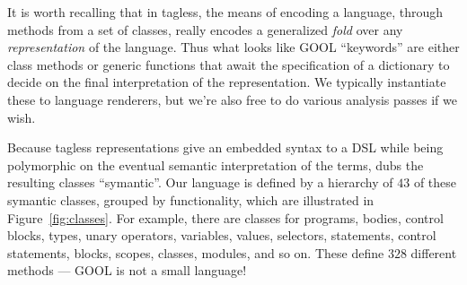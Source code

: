 \documentclass[sigplan,review,anonymous,prologue,dvipsnames]{acmart}
\begin{document}
It is worth recalling that in tagless, the means of encoding a language,
through methods from a set of classes, really encodes a generalized
\emph{fold} over any \emph{representation} of the language.  Thus what
looks like GOOL ``keywords'' are either class methods or generic functions
that await the specification of a dictionary to decide on the final
interpretation of the representation.  We typically instantiate these to
language renderers, but we're also free to do various analysis passes if
we wish.

Because tagless representations give an embedded syntax to a DSL while
being polymorphic on the eventual semantic interpretation of the terms,
\cite{carette2009finally} dubs the resulting classes ``symantic''.
Our language is defined by a hierarchy of $43$ of these symantic classes,
grouped by functionality, which are illustrated in Figure~\ref{fig:classes}.  
For example, there are classes for programs,
bodies, control blocks, types, unary operators, variables, values, selectors,
statements, control statements, blocks, scopes, classes, modules, and so
on.  These define $328$ different methods --- GOOL is not a small language!
\end{document}
